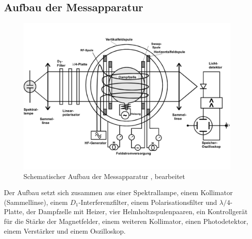 \subsection{Aufbau der Messapparatur}
%
%
\begin{figure}[h!]
  \centering
  \includegraphics[width=\textwidth]{aufbau.pdf}
  \caption{Schematischer Aufbau der Messapparatur \cite{1}, bearbeitet}
  \label{fig:aufbau}
\end{figure}
Der Aufbau setzt sich zusammen aus einer Spektrallampe, einem Kollimator (Sammellinse), einem $D_{1}$-Interferenzfilter, einem Polarisationsfilter und $\lambda/4$-Platte, der Dampfzelle mit Heizer, vier Helmholtzspulenpaaren, ein Kontrollgerät für die Stärke der Magnetfelder, einem weiteren Kollimator, einen Photodetektor, einem Verstärker und einem Oszilloskop.
